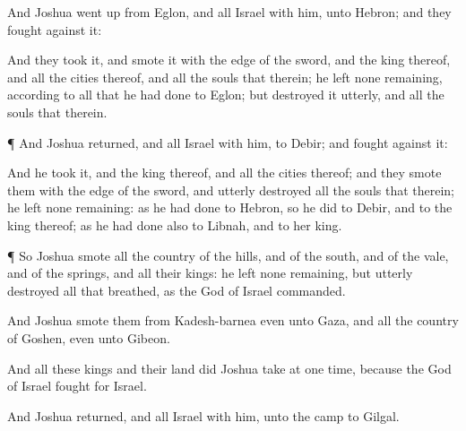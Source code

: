 {And
Joshua went
up from
Eglon, and all
Israel with him, unto
Hebron; and they
fought against it:

And they
took it, and
smote it with the
edge of the
sword, and the
king thereof, and all the
cities thereof, and all the
souls that
{} therein; he
left none
remaining, according to all that he had
done to
Eglon; but
destroyed it utterly, and all the
souls that
{} therein.


\par }{\PP {}¶ And
Joshua
returned, and all
Israel with him, to
Debir; and
fought against it:

And he
took it, and the
king thereof, and all the
cities thereof; and they
smote them with the
edge of the
sword, and utterly
destroyed all the
souls that
{} therein; he
left none
remaining: as he had
done to
Hebron, so he
did to
Debir, and to the
king thereof; as he had
done also to
Libnah, and to her
king.


\par }{\PP {}¶ So
Joshua
smote all the
country of the
hills, and of the
south, and of the
vale, and of the
springs, and all their
kings: he
left none
remaining, but utterly
destroyed all that
breathed, as the
{}
God of
Israel
commanded.

And
Joshua
smote them from
Kadesh-barnea even unto
Gaza, and all the
country of
Goshen, even unto
Gibeon.

And all these
kings and their
land did
Joshua
take at
one
time, because the
{}
God of
Israel
fought for
Israel.

And
Joshua
returned, and all
Israel with him, unto the
camp to
Gilgal.




\par }

